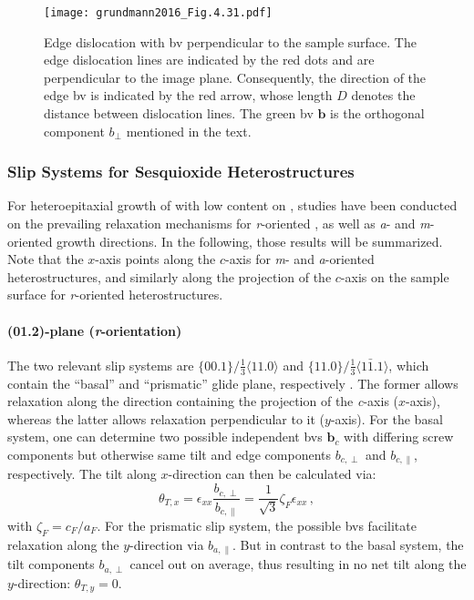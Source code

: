 \begin{figure}
    \centering
    \texttt{[image: grundmann2016\_Fig.4.31.pdf]}
    \caption{
        Edge dislocation with \gls{bv} perpendicular to the sample surface.
        The edge dislocation lines are indicated by the red dots and are perpendicular to the image plane.
        Consequently, the direction of the edge \gls{bv} is indicated by the red arrow, whose length $D$ denotes the distance between dislocation lines.
        The green \gls{bv} $\mathbf{b}$ is the orthogonal component $b_\perp$ mentioned in the text.
        }
    \label{fig:Theory_tiltDislocation}
\end{figure}
\subsubsection{Slip Systems for Sesquioxide Heterostructures}
For heteroepitaxial growth of  with low  content on , studies have been conducted on the prevailing relaxation mechanisms for \textit{r}-oriented
    \cite{grundmann2020b,grundmann2020a},
as well as \textit{a}- and \textit{m}-oriented
    \cite{kneiss2021}
growth directions.
In the following, those results will be summarized.
Note that the $x$-axis points along the $c$-axis for \textit{m}- and \textit{a}-oriented he\-terostructures, and similarly along the projection of the $c$-axis on the sample surface for \textit{r}-oriented heterostructures.

\paragraph{(01.2)-plane (\textit{r}-orientation)}
The two relevant slip systems are $\{00.1\}/\frac{1}{3}\langle11.0\rangle$ and $\{11.0\}/\frac{1}{3}\langle1\bar{1}.1\rangle$, which contain the \enquote{basal} and \enquote{prismatic} glide plane, respectively
    \cite{grundmann2020b}.
The former allows relaxation along the direction containing the projection of the \textit{c}-axis ($x$-axis), whereas the latter allows relaxation perpendicular to it ($y$-axis).
For the basal system, one can determine two possible independent \glspl{bv} $\mathbf{b}_c$ with differing screw components but otherwise same tilt and edge components $b_{c,\perp}$ and $b_{c,\parallel}$, respectively.
The tilt along $x$-direction can then be calculated via:
\begin{equation}
    \theta_{T,x}=\epsilon_{xx}\frac{b_{c,\perp}}{b_{c,\parallel}}=\frac{1}{\sqrt{3}}\zeta_F\epsilon_{xx}\,,
\end{equation}
with $\zeta_F=c_F/a_F$.
For the prismatic slip system, the possible \glspl{bv} facilitate relaxation along the $y$-direction via $b_{a,\parallel}$.
But in contrast to the basal system, the tilt components $b_{a,\perp}$ cancel out on average, thus resulting in no net tilt along the $y$-direction: $\theta_{T,y}=0$.

